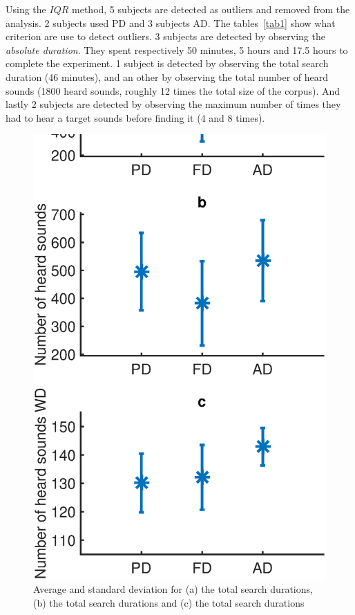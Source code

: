 \documentclass{aes2e}
\begin{document}
Using the $IQR$ method, 5 subjects are detected as outliers and removed from the analysis. 2 subjects used PD and 3 subjects AD. The tables~\ref{tab1} show what criterion are use to detect outliers. 3 subjects are detected by observing the \textit{absolute duration}. They spent respectively 50 minutes, 5 hours and 17.5 hours to complete the experiment. 1 subject is detected by observing the total search duration (46 minutes), and an other by observing the total number of heard sounds (1800 heard sounds, roughly 12 times the total size of the corpus). And lastly 2 subjects are detected by observing the maximum number of times they had to hear a target sounds before finding it (4 and 8 times).




\begin{figure}[t]
\begin{center}
\includegraphics[scale=0.4]{gfx/analyse1.eps} 
\end{center}
\caption{\label{fig1} Average and standard deviation for (a) the total search durations, (b) the total search durations and (c) the total search durations}
\end{figure}  
\end{document}
